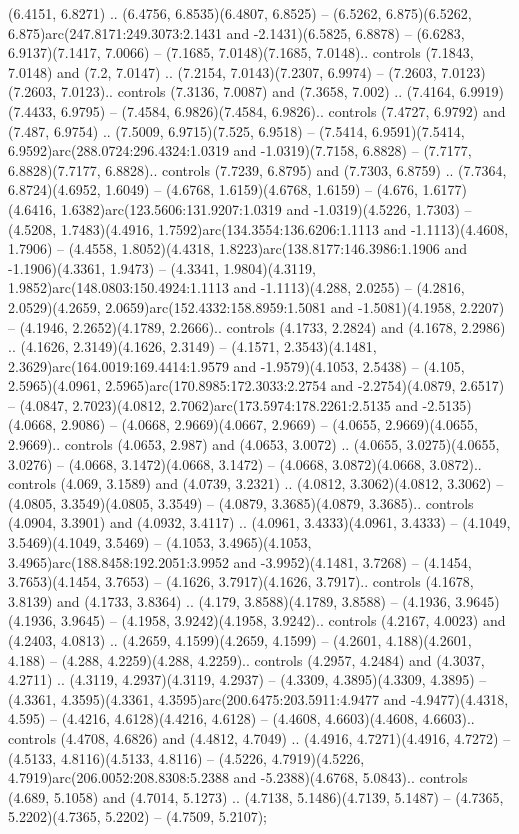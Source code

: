 (6.4151, 6.8271) .. (6.4756, 6.8535)(6.4807, 6.8525) -- (6.5262, 6.875)(6.5262, 6.875)arc(247.8171:249.3073:2.1431 and -2.1431)(6.5825, 6.8878) -- (6.6283, 6.9137)(7.1417, 7.0066) -- (7.1685, 7.0148)(7.1685, 7.0148).. controls (7.1843, 7.0148) and (7.2, 7.0147) .. (7.2154, 7.0143)(7.2307, 6.9974) -- (7.2603, 7.0123)(7.2603, 7.0123).. controls (7.3136, 7.0087) and (7.3658, 7.002) .. (7.4164, 6.9919)(7.4433, 6.9795) -- (7.4584, 6.9826)(7.4584, 6.9826).. controls (7.4727, 6.9792) and (7.487, 6.9754) .. (7.5009, 6.9715)(7.525, 6.9518) -- (7.5414, 6.9591)(7.5414, 6.9592)arc(288.0724:296.4324:1.0319 and -1.0319)(7.7158, 6.8828) -- (7.7177, 6.8828)(7.7177, 6.8828).. controls (7.7239, 6.8795) and (7.7303, 6.8759) .. (7.7364, 6.8724)(4.6952, 1.6049) -- (4.6768, 1.6159)(4.6768, 1.6159) -- (4.676, 1.6177)(4.6416, 1.6382)arc(123.5606:131.9207:1.0319 and -1.0319)(4.5226, 1.7303) -- (4.5208, 1.7483)(4.4916, 1.7592)arc(134.3554:136.6206:1.1113 and -1.1113)(4.4608, 1.7906) -- (4.4558, 1.8052)(4.4318, 1.8223)arc(138.8177:146.3986:1.1906 and -1.1906)(4.3361, 1.9473) -- (4.3341, 1.9804)(4.3119, 1.9852)arc(148.0803:150.4924:1.1113 and -1.1113)(4.288, 2.0255) -- (4.2816, 2.0529)(4.2659, 2.0659)arc(152.4332:158.8959:1.5081 and -1.5081)(4.1958, 2.2207) -- (4.1946, 2.2652)(4.1789, 2.2666).. controls (4.1733, 2.2824) and (4.1678, 2.2986) .. (4.1626, 2.3149)(4.1626, 2.3149) -- (4.1571, 2.3543)(4.1481, 2.3629)arc(164.0019:169.4414:1.9579 and -1.9579)(4.1053, 2.5438) -- (4.105, 2.5965)(4.0961, 2.5965)arc(170.8985:172.3033:2.2754 and -2.2754)(4.0879, 2.6517) -- (4.0847, 2.7023)(4.0812, 2.7062)arc(173.5974:178.2261:2.5135 and -2.5135)(4.0668, 2.9086) -- (4.0668, 2.9669)(4.0667, 2.9669) -- (4.0655, 2.9669)(4.0655, 2.9669).. controls (4.0653, 2.987) and (4.0653, 3.0072) .. (4.0655, 3.0275)(4.0655, 3.0276) -- (4.0668, 3.1472)(4.0668, 3.1472) -- (4.0668, 3.0872)(4.0668, 3.0872).. controls (4.069, 3.1589) and (4.0739, 3.2321) .. (4.0812, 3.3062)(4.0812, 3.3062) -- (4.0805, 3.3549)(4.0805, 3.3549) -- (4.0879, 3.3685)(4.0879, 3.3685).. controls (4.0904, 3.3901) and (4.0932, 3.4117) .. (4.0961, 3.4333)(4.0961, 3.4333) -- (4.1049, 3.5469)(4.1049, 3.5469) -- (4.1053, 3.4965)(4.1053, 3.4965)arc(188.8458:192.2051:3.9952 and -3.9952)(4.1481, 3.7268) -- (4.1454, 3.7653)(4.1454, 3.7653) -- (4.1626, 3.7917)(4.1626, 3.7917).. controls (4.1678, 3.8139) and (4.1733, 3.8364) .. (4.179, 3.8588)(4.1789, 3.8588) -- (4.1936, 3.9645)(4.1936, 3.9645) -- (4.1958, 3.9242)(4.1958, 3.9242).. controls (4.2167, 4.0023) and (4.2403, 4.0813) .. (4.2659, 4.1599)(4.2659, 4.1599) -- (4.2601, 4.188)(4.2601, 4.188) -- (4.288, 4.2259)(4.288, 4.2259).. controls (4.2957, 4.2484) and (4.3037, 4.2711) .. (4.3119, 4.2937)(4.3119, 4.2937) -- (4.3309, 4.3895)(4.3309, 4.3895) -- (4.3361, 4.3595)(4.3361, 4.3595)arc(200.6475:203.5911:4.9477 and -4.9477)(4.4318, 4.595) -- (4.4216, 4.6128)(4.4216, 4.6128) -- (4.4608, 4.6603)(4.4608, 4.6603).. controls (4.4708, 4.6826) and (4.4812, 4.7049) .. (4.4916, 4.7271)(4.4916, 4.7272) -- (4.5133, 4.8116)(4.5133, 4.8116) -- (4.5226, 4.7919)(4.5226, 4.7919)arc(206.0052:208.8308:5.2388 and -5.2388)(4.6768, 5.0843).. controls (4.689, 5.1058) and (4.7014, 5.1273) .. (4.7138, 5.1486)(4.7139, 5.1487) -- (4.7365, 5.2202)(4.7365, 5.2202) -- (4.7509, 5.2107);



